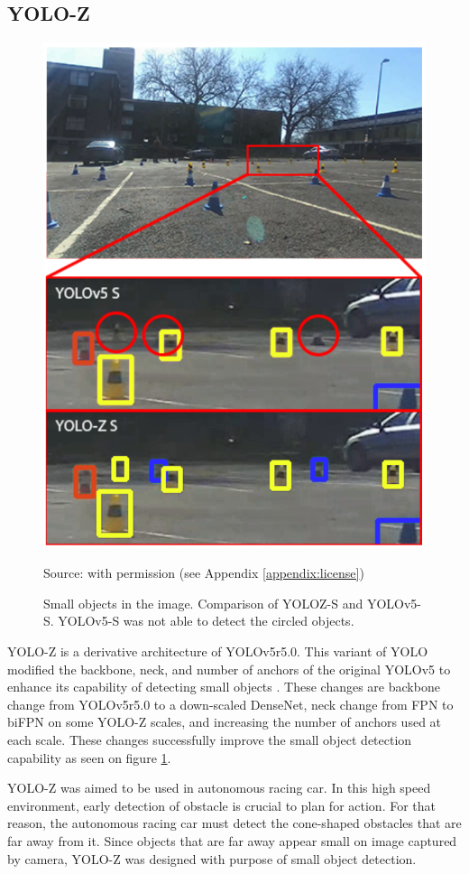   \subsection{YOLO-Z}
  \begin{figure}
    \centering
    \includegraphics[width=.7\textwidth]{figures/yoloz-result.png}
    \caption*{Source: \textcite{yoloz} with permission (see Appendix \ref{appendix:license})}
    \caption{Small objects in the image. Comparison of YOLOZ-S and YOLOv5-S. YOLOv5-S was not able to detect the circled objects.}
    \label{fig:yolozcone}
  \end{figure}
  YOLO-Z is a derivative architecture of YOLOv5r5.0.
  This variant of YOLO modified the backbone, neck, and number of anchors of the original YOLOv5 to 
  enhance its capability of detecting small objects \parencite{yoloz}.
  These changes are backbone change from YOLOv5r5.0 to a down-scaled DenseNet,
  neck change from FPN to biFPN on some YOLO-Z scales, and increasing the number of anchors used at each scale.
  These changes successfully improve the small object detection capability as seen on figure \ref{fig:yolozcone}.

  YOLO-Z was aimed to be used in autonomous racing car. In this high speed environment, early detection
  of obstacle is crucial to plan for action. For that reason, the autonomous racing car must detect the cone-shaped obstacles
  that are far away from it. Since objects that are far away appear small on image captured by camera, YOLO-Z was designed with
  purpose of small object detection.

